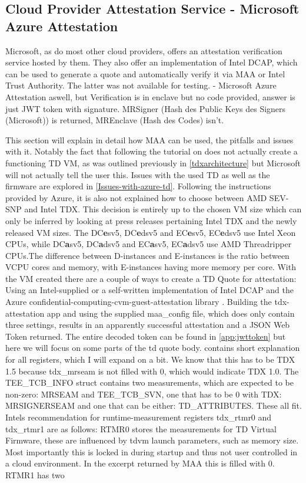 \subsection{Cloud Provider Attestation Service - Microsoft Azure Attestation}
 Microsoft, as do most other cloud providers, offers an attestation verification service hosted by them. They also offer an implementation of Intel DCAP, which can be used to generate a quote and automatically verify it via MAA or Intel Trust Authority. The latter was not available for testing.
- Microsoft Azure Attestation aswell, but Verification is in enclave but no code provided, answer is just JWT token with signature. MRSigner (Hash des Public Keys des Signers (Microsoft)) is returned, MREnclave (Hash des Codes) isn't.

This section will explain in detail how MAA can be used, the pitfalls and issues with it. Notably the fact that following the tutorial on \cite{chasecrum_github_create_2024} does not actually create a functioning TD VM, as was outlined previously in \ref{tdxarchitecture} but Microsoft will not actually tell the user this. Issues with the used TD as well as the firmware are explored in \ref{Issues-with-azure-td}. Following the instructions provided by Azure, it is also not explained how to choose between AMD SEV-SNP and Intel TDX. This decision is entirely up to the chosen VM size which can only be inferred by looking at press releases pertaining Intel TDX and the newly released VM sizes. The DC\textbf{e}sv5, DC\textbf{e}dsv5 and EC\textbf{e}sv5, EC\textbf{e}dsv5 use Intel Xeon CPUs, while DC\textbf{a}sv5, DC\textbf{a}dsv5 and EC\textbf{a}sv5, EC\textbf{a}dsv5 use AMD Threadripper CPUs.The difference between D-instances and E-instances is the ratio between VCPU cores and memory, with E-instances having more memory per core. With the VM created there are a couple of ways to create a TD Quote for attestation: Using an Intel-supplied or a self-written implementation of Intel DCAP and the Azure confidential-computing-cvm-guest-attestation library \cite{microsoft_corporation_azureconfidential-computing-cvm-guest-attestation_nodate}. Building the tdx-attestation app and using the supplied maa\_config file, which does only contain three settings, results in an apparently successful attestation and a JSON Web Token returned. The entire decoded token can be found in \ref{app:jwttoken} but here we will focus on some parts of the td quote body. \cite{intel_corporation_dcap_2024-1} contains short explanation for all registers, which I will expand on a bit. We know that this has to be TDX 1.5 because tdx\_mrseam is not filled with 0, which would indicate TDX 1.0. The TEE\_TCB\_INFO struct contains two measurements, which are expected to be non-zero: MRSEAM and TEE\_TCB\_SVN, one that has to be 0 with TDX: MRSIGNERSEAM and one that can be either: TD\_ATTRIBUTES. These all fit. Intels recommendation for runtime-measurement registers tdx\_rtmr0 and tdx\_rtmr1 are as follows: RTMR0 stores the measurements for TD Virtual Firmware, these are influenced by tdvm launch parameters, such as memory size. Most importantly this is locked in during startup and thus not user controlled in a cloud environment. In the excerpt returned by MAA this is filled with 0. RTMR1 has two 